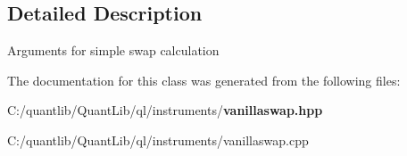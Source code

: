 \subsection{Detailed Description}
Arguments for simple swap calculation 

The documentation for this class was generated from the following files\+:\begin{DoxyCompactItemize}
\item 
C\+:/quantlib/\+Quant\+Lib/ql/instruments/{\bf vanillaswap.\+hpp}\item 
C\+:/quantlib/\+Quant\+Lib/ql/instruments/vanillaswap.\+cpp\end{DoxyCompactItemize}
